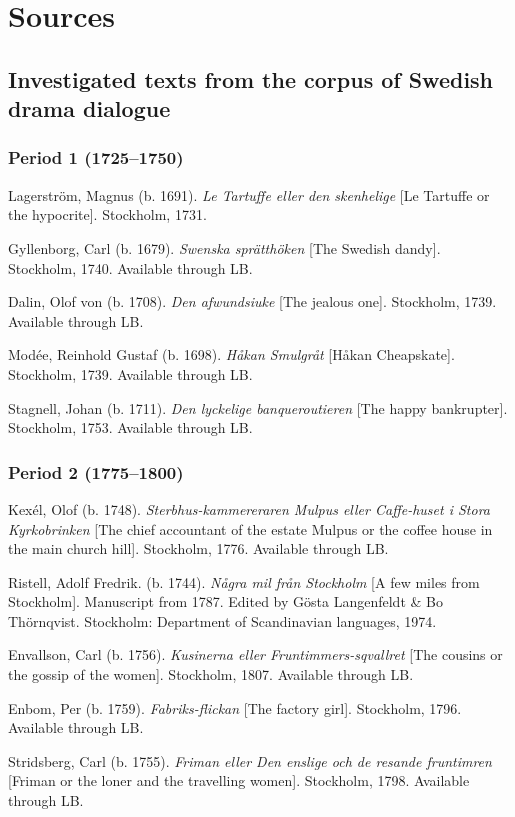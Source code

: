 \documentclass[output=paper, colorlinks, citecolor=brown]{langscibook}
\begin{document}
\section*{Sources}

\subsection*{Investigated texts from the corpus of Swedish drama dialogue }
\subsubsection*{Period 1 (1725--1750)}

\begin{description}[font=\normalfont]\sloppy
\item[1A:] Lagerström, Magnus (b. 1691). \textit{Le Tartuffe eller den skenhelige}  [Le Tartuffe or the hypocrite]. Stockholm, 1731. 
\item[1B:] Gyllenborg, Carl (b. 1679). \textit{Swenska sprätthöken} [The Swedish dandy]. Stockholm, 1740. Available through LB.
\item[1C:] Dalin, Olof von (b. 1708). \textit{Den afwundsiuke} [The jealous one]. Stockholm, 1739. Available through LB. 
\item[1D:] Modée, Reinhold Gustaf (b. 1698). \textit{Håkan Smulgråt} [Håkan Cheapskate]. Stockholm, 1739. Available through LB. 
\item[1E:] Stagnell, Johan (b. 1711). \textit{Den lyckelige banqueroutieren} [The happy bankrupter]. Stockholm, 1753. Available through LB.
\end{description}


\subsubsection*{Period 2 (1775–1800)}
\begin{description}[font=\normalfont]\sloppy
\item[2A:] Kexél, Olof (b. 1748). \textit{Sterbhus-kammereraren Mulpus eller Caffe-huset i Stora Kyrkobrinken} [The chief accountant of the estate Mulpus or the coffee house in the main church hill]. Stockholm, 1776. Available through LB.
\item[2B:] Ristell, Adolf Fredrik. (b. 1744). \textit{Några mil från Stockholm} [A few miles from Stockholm]. Manuscript from 1787. Edited by Gösta Langenfeldt \& Bo Thörnqvist. Stockholm: Department of Scandinavian languages, 1974. 
\item[2C:] Envallson, Carl (b. 1756). \textit{Kusinerna eller Fruntimmers-sqvallret} [The cousins or the gossip of the women]. Stockholm, 1807. Available through LB.
\item[2D:] Enbom, Per (b. 1759). \textit{Fabriks-flickan} [The factory girl]. Stockholm, 1796. Available through LB.
\item[2E:] Stridsberg, Carl (b. 1755). \textit{Friman eller Den enslige och de resande fruntimren} [Friman or the loner and the travelling women]. Stockholm, 1798. Available through LB.
\end{description}
\end{document}
